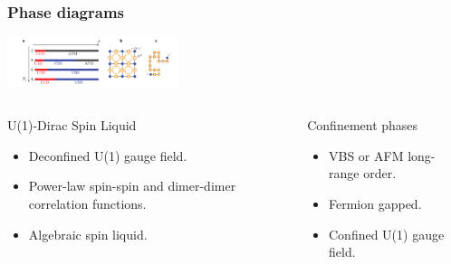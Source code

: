 \documentclass[xcolor=table, 10pt, aspectratio=43]{beamer}
\begin{document}
\begin{frame}
  \frametitle{Phase diagrams}
  \begin{center}
    \includegraphics[width=5cm]{../u1sl/phase-diagram}
  \end{center}
  \begin{columns}[t]
    \begin{block}{U(1)-Dirac Spin Liquid}
      \begin{itemize}
        \item Deconfined U(1) gauge field.
        \item Power-law spin-spin and dimer-dimer correlation functions.
        \item Algebraic spin liquid.
      \end{itemize}
    \end{block}

    \begin{block}{Confinement phases}
      \begin{itemize}
        \item VBS or AFM long-range order.
        \item Fermion gapped.
        \item Confined U(1) gauge field.
      \end{itemize}
    \end{block}
  \end{columns}
\end{frame}
\end{document}
